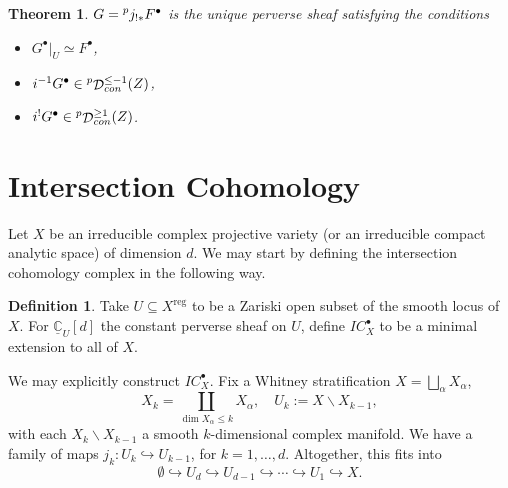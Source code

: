 \documentclass[letterpaper, 12pt]{article}
\newcommand{\C}{\mathbb{C}}
\DeclareMathOperator{\D}{\mathcal{D}}
\newtheorem{theorem}{Theorem}
\theoremstyle{definition}
\newtheorem{definition}{Definition}
\theoremstyle{remark}
\begin{document}
\begin{theorem}\label{minimal-characterization}
    $G = \prescript{p}{}{j_{!*}} F^\bullet$ is the unique perverse sheaf 
    satisfying the conditions
    \begin{itemize}
        \item[(i)] $G^\bullet|_U \simeq F^\bullet$,
        \item[(ii)] $i^{-1} G^\bullet \in 
        \prescript{p}{}{\D}^{\leq -1}_{con}(Z)$,
        \item[(iii)] \(i^! G^\bullet \in 
        \prescript{p}{}{\D}^{\geq 1}_{con}(Z)\).
    \end{itemize}
\end{theorem}




\section{Intersection Cohomology}

Let $X$ be an irreducible complex projective variety (or an irreducible compact analytic space) of dimension $d$. We may start by defining the intersection cohomology complex in the following way.
\begin{definition}
    Take $U \subseteq X^{\text{reg}}$ to be a Zariski open subset of the smooth locus of $X$. For $\underline{\C}_U[d]$ the constant perverse sheaf on $U$, define $IC_X^{\bullet}$ to be a minimal extension to all of $X$.
\end{definition}

We may explicitly construct $IC_X^{\bullet}$. Fix a Whitney stratification $X = \bigsqcup_\alpha X_{\alpha}$, 
\begin{equation}
    X_k = \coprod_{\dim X_\alpha \leq k} X_\alpha, \quad U_k := X \smallsetminus X_{k-1},
\end{equation}
with each $X_k \smallsetminus X_{k-1}$ a smooth $k$-dimensional complex manifold. We have a family of maps $j_k: U_k \hookrightarrow U_{k-1}$, for $k=1,\dots, d$. Altogether, this fits into
\begin{equation}
    \emptyset \hookrightarrow U_d \hookrightarrow U_{d-1} \hookrightarrow \cdots
    \hookrightarrow U_1 \hookrightarrow X.
\end{equation}
\end{document}
